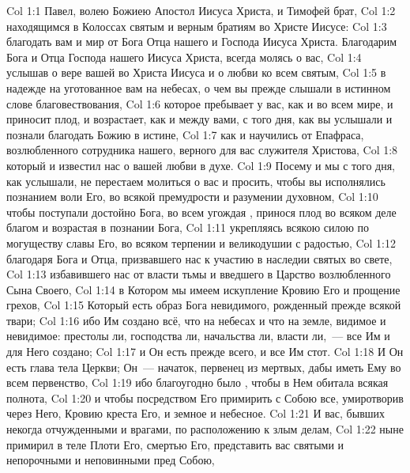\vs Col 1:1 Павел, волею Божиею Апостол Иисуса Христа, и Тимофей брат,
\vs Col 1:2 находящимся в Колоссах святым и верным братиям во Христе Иисусе:
\vs Col 1:3 благодать вам и мир от Бога Отца нашего и Господа Иисуса Христа. Благодарим Бога и Отца Господа нашего Иисуса Христа, всегда молясь о вас,
\vs Col 1:4 услышав о вере вашей во Христа Иисуса и о любви ко всем святым,
\vs Col 1:5 в надежде на уготованное вам на небесах, о чем вы прежде слышали в истинном слове благовествования,
\vs Col 1:6 которое пребывает у вас, как и во всем мире, и приносит плод, и возрастает, как и между вами, с того дня, как вы услышали и познали благодать Божию в истине,
\vs Col 1:7 как и научились от Епафраса, возлюбленного сотрудника нашего, верного для вас служителя Христова,
\vs Col 1:8 который и известил нас о вашей любви в духе.
\rsbpar\vs Col 1:9 Посему и мы с того дня, как  услышали, не перестаем молиться о вас и просить, чтобы вы исполнялись познанием воли Его, во всякой премудрости и разумении духовном,
\vs Col 1:10 чтобы поступали достойно Бога, во всем угождая , принося плод во всяком деле благом и возрастая в познании Бога,
\vs Col 1:11 укрепляясь всякою силою по могуществу славы Его, во всяком терпении и великодушии с радостью,
\vs Col 1:12 благодаря Бога и Отца, призвавшего нас к участию в наследии святых во свете,
\vs Col 1:13 избавившего нас от власти тьмы и введшего в Царство возлюбленного Сына Своего,
\vs Col 1:14 в Котором мы имеем искупление Кровию Его и прощение грехов,
\vs Col 1:15 Который есть образ Бога невидимого, рожденный прежде всякой твари;
\vs Col 1:16 ибо Им создано всё, что на небесах и что на земле, видимое и невидимое: престолы ли, господства ли, начальства ли, власти ли,~--- все Им и для Него создано;
\vs Col 1:17 и Он есть прежде всего, и все Им стот.
\vs Col 1:18 И Он есть глава тела Церкви; Он~--- начаток, первенец из мертвых, дабы иметь Ему во всем первенство,
\vs Col 1:19 ибо благоугодно было , чтобы в Нем обитала всякая полнота,
\vs Col 1:20 и чтобы посредством Его примирить с Собою все, умиротворив через Него, Кровию креста Его, и земное и небесное.
\vs Col 1:21 И вас, бывших некогда отчужденными и врагами, по расположению к злым делам,
\vs Col 1:22 ныне примирил в теле Плоти Его, смертью Его,  представить вас святыми и непорочными и неповинными пред Собою,
